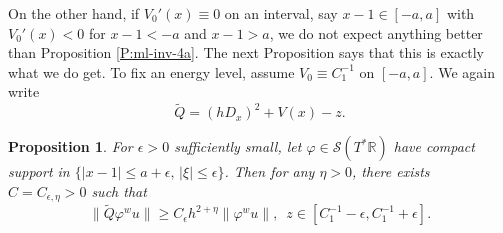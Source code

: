 \documentclass[twoside, final]{amsart}
\newtheorem{proposition}{Proposition}[section]
\theoremstyle{definition}
\numberwithin{equation}{section}
\begin{document}
On the other hand, if $V_0'(x) \equiv 0$ on an interval, say $x-1 \in
[-a,a]$ with $V_0'(x) < 0$ for $x -1< -a$ and $x -1 > a$, we do not expect
anything better than Proposition \ref{P:ml-inv-4a}.  The
next Proposition says that this is exactly what we do get.  To fix an energy
level, assume $V_0 \equiv
C_1^{-1}$ on $[-a,a]$.  We again write
\[
{\widetilde{Q}} = (hD_x)^2 + V(x) -z.
\]
\begin{proposition}
\label{P:ml-inv-4b}
For $\epsilon>0$ sufficiently small, let ${\varphi} \in {{\mathcal S}}(T^* {{\mathbb R}})$
have compact support in $\{ |x-1| {\leqslant} a + \epsilon, \, |\xi| {\leqslant} \epsilon\}$.  Then for
any $\eta>0$, there
exists $C = C_{\epsilon,\eta}>0$ such that 
\begin{equation}
\label{E:ml-inv-4b}
\| {\widetilde{Q}} {\varphi}^w u \| {\geqslant} C_\epsilon {h^{2 + \eta}} \|
{\varphi}^w u \|, \,\,\, z \in  [C_1^{-1}-\epsilon, C_1^{-1} + \epsilon].
\end{equation}
\end{proposition}
\end{document}
